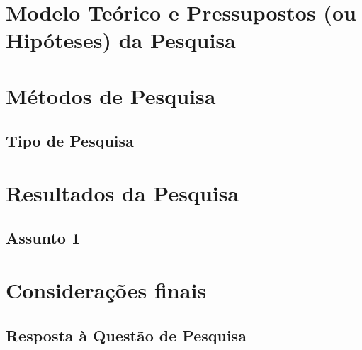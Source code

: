 \chapter{Modelo Teórico e Pressupostos (ou Hipóteses) da Pesquisa}


\chapter{Métodos de Pesquisa}

\section{Tipo de Pesquisa}



\chapter{Resultados da Pesquisa}

\section{Assunto 1}



\chapter{Considerações finais}

\section{Resposta à Questão de Pesquisa}

